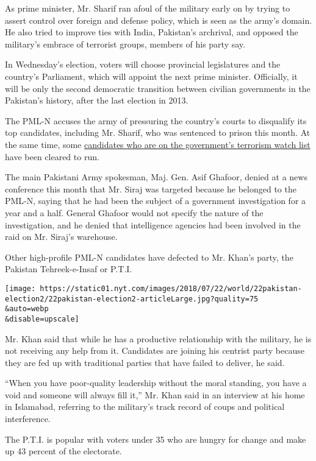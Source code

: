 As prime minister, Mr. Sharif ran afoul of the military early on by
trying to assert control over foreign and defense policy, which is seen
as the army's domain. He also tried to improve ties with India,
Pakistan's archrival, and opposed the military's embrace of terrorist
groups, members of his party say.

In Wednesday's election, voters will choose provincial legislatures and
the country's Parliament, which will appoint the next prime minister.
Officially, it will be only the second democratic transition between
civilian governments in the Pakistan's history, after the last election
in 2013.

The PML-N accuses the army of pressuring the country's courts to
disqualify its top candidates, including Mr. Sharif, who was sentenced
to prison this month. At the same time, some
\href{https://www.nytimes.com/2018/07/17/world/asia/pakistan-election-extremists.html}{candidates
who are on the government's terrorism watch list} have been cleared to
run.

The main Pakistani Army spokesman, Maj. Gen. Asif Ghafoor, denied at a
news conference this month that Mr. Siraj was targeted because he
belonged to the PML-N, saying that he had been the subject of a
government investigation for a year and a half. General Ghafoor would
not specify the nature of the investigation, and he denied that
intelligence agencies had been involved in the raid on Mr. Siraj's
warehouse.

Other high-profile PML-N candidates have defected to Mr. Khan's party,
the Pakistan Tehreek-e-Insaf or P.T.I.

\texttt{[image: https://static01.nyt.com/images/2018/07/22/world/22pakistan-election2/22pakistan-election2-articleLarge.jpg?quality=75\\\&auto=webp\\\&disable=upscale]}

Mr. Khan said that while he has a productive relationship with the
military, he is not receiving any help from it. Candidates are joining
his centrist party because they are fed up with traditional parties that
have failed to deliver, he said.

``When you have poor-quality leadership without the moral standing, you
have a void and someone will always fill it,'' Mr. Khan said in an
interview at his home in Islamabad, referring to the military's track
record of coups and political interference.

The P.T.I. is popular with voters under 35 who are hungry for change and
make up 43 percent of the electorate.

